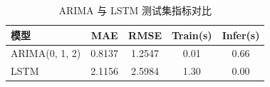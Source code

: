 \begin{table}[htbp]
\centering
\caption{ARIMA 与 LSTM 测试集指标对比}
\begin{tabular}{lcccc}
\toprule
模型 & MAE & RMSE & Train(s) & Infer(s) \\
\midrule
ARIMA(0, 1, 2) & 0.8137 & 1.2547 & 0.01 & 0.66 \\
LSTM & 2.1156 & 2.5984 & 1.30 & 0.00 \\
\bottomrule
\end{tabular}
\end{table}
